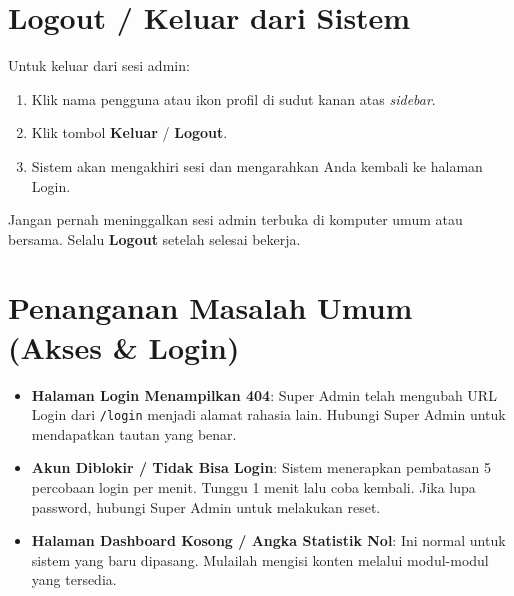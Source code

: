 \section{Logout / Keluar dari Sistem}

Untuk keluar dari sesi admin:
\begin{enumerate}
  \item Klik nama pengguna atau ikon profil di sudut kanan atas \textit{sidebar}.
  \item Klik tombol \textbf{Keluar} / \textbf{Logout}.
  \item Sistem akan mengakhiri sesi dan mengarahkan Anda kembali ke halaman Login.
\end{enumerate}

\begin{warnbox}
  Jangan pernah meninggalkan sesi admin terbuka di komputer umum atau bersama.
  Selalu \textbf{Logout} setelah selesai bekerja.
\end{warnbox}

\section{Penanganan Masalah Umum (Akses \& Login)}

\begin{itemize}
  \item \textbf{Halaman Login Menampilkan 404}: Super Admin telah mengubah URL Login
        dari \texttt{/login} menjadi alamat rahasia lain. Hubungi Super Admin untuk
        mendapatkan tautan yang benar.
  \item \textbf{Akun Diblokir / Tidak Bisa Login}: Sistem menerapkan pembatasan
        5 percobaan login per menit. Tunggu 1 menit lalu coba kembali. Jika lupa
        password, hubungi Super Admin untuk melakukan reset.
  \item \textbf{Halaman Dashboard Kosong / Angka Statistik Nol}: Ini normal untuk
        sistem yang baru dipasang. Mulailah mengisi konten melalui modul-modul
        yang tersedia.
\end{itemize}

